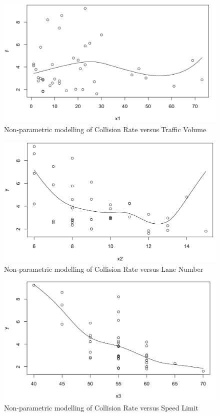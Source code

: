 \documentclass[12pt]{report}
\begin{document}
\begin{figure}[H]
    \centering
    \includegraphics[width=1\textwidth]{Non-parametric/Non-para x1.png}
    \caption{Non-parametric modelling of Collision Rate versus Traffic Volume} \label{fig:NP1}
\end{figure}
\noindent

\begin{figure}[H]
    \centering
    \includegraphics[width=1\textwidth]{Non-parametric/Non-para x2.png}
    \caption{Non-parametric modelling of Collision Rate versus Lane Number} \label{fig:NP2}
\end{figure}
\noindent

\begin{figure}[H]
    \centering
    \includegraphics[width=1\textwidth]{Non-parametric/Non-para x3.png}
    \caption{Non-parametric modelling of Collision Rate versus Speed Limit} \label{fig:NP3}
\end{figure}
\noindent
\end{document}
